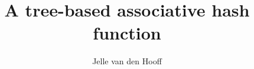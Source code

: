 \documentclass[10pt,letterpaper]{artikel3}
\begin{document}
\title{A tree-based associative hash function}
\author{Jelle van den Hooff}
\date{\vspace{-2ex}}
\maketitle





% 




\end{document}
